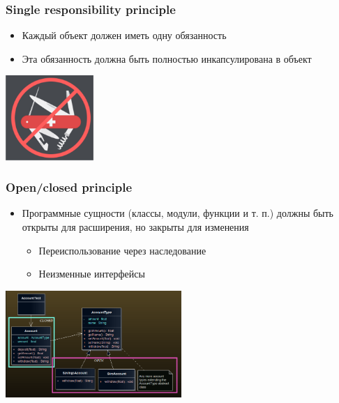 \documentclass{../cscslides}
\begin{document}
    \begin{frame}
        \frametitle{Single responsibility principle}
        \begin{itemize}
            \item Каждый объект должен иметь одну обязанность
            \item Эта обязанность должна быть полностью инкапсулирована в объект
        \end{itemize}
        \begin{flushright}
            \includegraphics[width=0.25\textwidth]{singleResponsibility.png}
        \end{flushright}
    \end{frame}

    \begin{frame}
        \frametitle{Open/closed principle}
        \begin{itemize}
            \item Программные сущности (классы, модули, функции и т. п.) должны быть открыты для расширения, но закрыты для изменения
            \begin{itemize}
                \item Переиспользование через наследование
                \item Неизменные интерфейсы
            \end{itemize}
        \end{itemize}
        \begin{flushright}
            \includegraphics[width=0.5\textwidth]{openClosedPrincipleBlack.png}
        \end{flushright}
    \end{frame}
\end{document}
